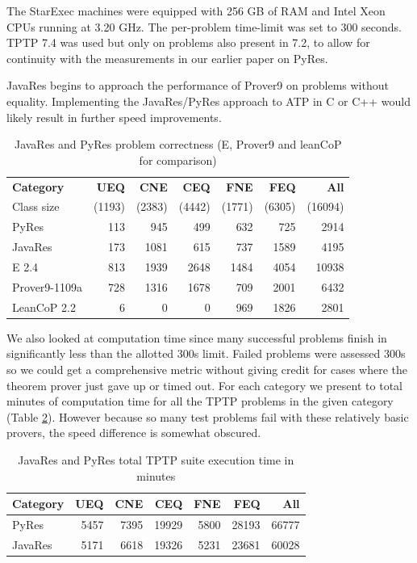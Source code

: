 \documentclass{llncs}
\begin{document}
The StarExec machines were equipped with 256 GB of RAM and Intel Xeon
CPUs running at 3.20 GHz.  The per-problem time-limit was set to 300
seconds. TPTP 7.4 was used but only on problems also present in 7.2,
to allow for continuity with the measurements in our earlier paper on
PyRes.

JavaRes begins to approach the performance of Prover9 on problems without
equality.  Implementing the JavaRes/PyRes approach to ATP
in C or C++ would likely result in further speed improvements.

\begin{table}[tbh]
  \begin{tabular}{lrrrrrr}
    \hline
    \textbf{Category} & \textbf{UEQ} & \textbf{CNE} & \textbf{CEQ} & \textbf{FNE} & \textbf{FEQ} & \textbf{All}\\
    {\tiny Class size} & {\tiny (1193)} & {\tiny (2383)} & {\tiny (4442)} & {\tiny (1771)} & {\tiny (6305)} & {\tiny (16094)}\\
    \hline
    PyRes              &   113 &  945 &   499 &   632 &   725 &  2914 \\
    JavaRes            &   173 & 1081 &   615 &   737 &  1589 &  4195 \\
    \hline
    E 2.4              &   813 &  1939 &  2648 &  1484 &  4054 & 10938 \\
    Prover9-1109a      &   728 &  1316 &  1678 &   709 &  2001 &  6432 \\
    LeanCoP 2.2        &     6 &     0 &     0 &   969 &  1826 &  2801 \\
    \hline
  \end{tabular}
  \caption{JavaRes and PyRes problem correctness (E, Prover9 and leanCoP for comparison)}
  \label{tab:res}
\end{table}

We also looked at computation time since many successful problems finish in significantly less than the allotted
300s limit.  Failed problems were assessed 300s so we could get a comprehensive metric without giving credit
for cases where the theorem prover just gave up or timed out.  For each category we present to total minutes of computation time for all
the TPTP problems in the given category (Table \ref{tab:res2}). However because so many test problems fail with these
relatively basic provers, the speed difference is somewhat obscured.

\begin{table}[tbh]
  \begin{tabular}{lrrrrrr}
    \hline
    \textbf{Category} & \textbf{UEQ} & \textbf{CNE} & \textbf{CEQ} & \textbf{FNE} & \textbf{FEQ} & \textbf{All}\\
    \hline
    PyRes              &   5457 &  7395 &   19929 &   5800 &   28193 &  66777 \\
    JavaRes            &   5171 &  6618 &   19326 &   5231 &   23681 &  60028 \\
    \hline
  \end{tabular}
  \caption{JavaRes and PyRes total TPTP suite execution time in minutes}
  \label{tab:res2}
\end{table}
\end{document}
